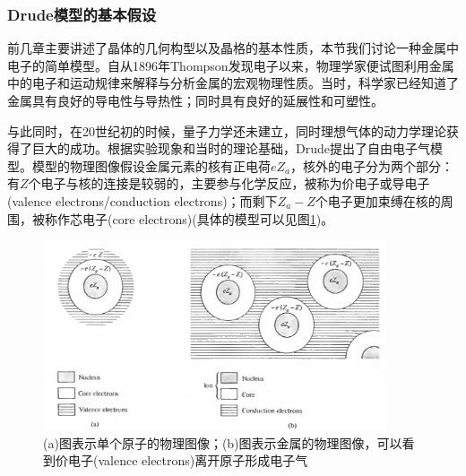 \documentclass{ctexart}
\begin{document}
            \subsubsection{Drude模型的基本假设}
            前几章主要讲述了晶体的几何构型以及晶格的基本性质，本节我们讨论一种金属中电子的简单模型。自从1896年Thompson发现电子以来，物理学家便试图利用金属中的电子和运动规律来解释与分析金属的宏观物理性质。当时，科学家已经知道了金属具有良好的导电性与导热性；同时具有良好的延展性和可塑性。
            
            与此同时，在20世纪初的时候，量子力学还未建立，同时理想气体的动力学理论获得了巨大的成功。根据实验现象和当时的理论基础，Drude提出了自由电子气模型。模型的物理图像假设金属元素的核有正电荷$eZ_a$，核外的电子分为两个部分：有$Z$个电子与核的连接是较弱的，主要参与化学反应，被称为价电子或导电子(valence electrons/conduction electrons)；而剩下$Z_a-Z$个电子更加束缚在核的周围，被称作芯电子(core electrons)(具体的模型可以见图\ref{fig:DrudeModel})。
            \begin{figure}[H]
                \centering
                \includegraphics[width=0.9\textwidth]{figure/Drude_Model.png}
                \caption{(a)图表示单个原子的物理图像；(b)图表示金属的物理图像，可以看到价电子(valence electrons)离开原子形成电子气}
                \label{fig:DrudeModel}
            \end{figure}
                
\end{document}
